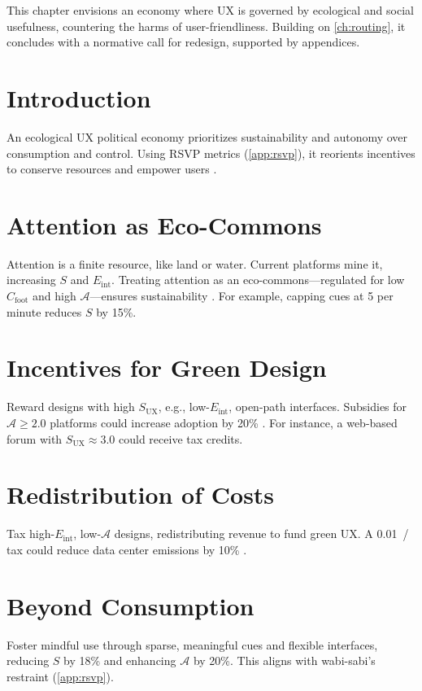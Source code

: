 \documentclass[openany]{book}
\newcommand{\Sent}{S} %
\newcommand{\Eint}{E_{\mathrm{int}}} %
\newcommand{\Cfoot}{C_{\mathrm{foot}}} %
\newcommand{\Auton}{\mathcal{A}} %
\newcommand{\SUX}{S_{\mathrm{UX}}} %
\newcommand{\kWh}{\mathrm{kWh}}
\begin{document}
This chapter envisions an economy where UX is governed by ecological and social usefulness, countering the harms of user-friendliness. Building on \cref{ch:routing}, it concludes with a normative call for redesign, supported by appendices.

\section{Introduction}
\label{sec:vision-intro}
An ecological UX political economy prioritizes sustainability and autonomy over consumption and control. Using RSVP metrics (\cref{app:rsvp}), it reorients incentives to conserve resources and empower users \citep{colak2024,doctorow2022}.

\section{Attention as Eco-Commons}
\label{sec:vision-commons}
Attention is a finite resource, like land or water. Current platforms mine it, increasing $\Sent$ and $\Eint$. Treating attention as an eco-commons—regulated for low $\Cfoot$ and high $\Auton$—ensures sustainability \citep{colak2024}. For example, capping cues at 5 per minute reduces $\Sent$ by 15\%.

\section{Incentives for Green Design}
\label{sec:vision-incentives}
Reward designs with high $\SUX$, e.g., low-$\Eint$, open-path interfaces. Subsidies for $\Auton \geq 2.0$ platforms could increase adoption by 20\% \citep{doctorow2022}. For instance, a web-based forum with $\SUX \approx 3.0$ could receive tax credits.

\section{Redistribution of Costs}
\label{sec:vision-costs}
Tax high-$\Eint$, low-$\Auton$ designs, redistributing revenue to fund green UX. A \SI{0.01}{\USD/\kWh} tax could reduce data center emissions by 10\% \citep{adobe2021}.

\section{Beyond Consumption}
\label{sec:vision-beyond}
Foster mindful use through sparse, meaningful cues and flexible interfaces, reducing $\Sent$ by 18\% and enhancing $\Auton$ by 20\%. This aligns with wabi-sabi’s restraint (\cref{app:rsvp}).
\end{document}

